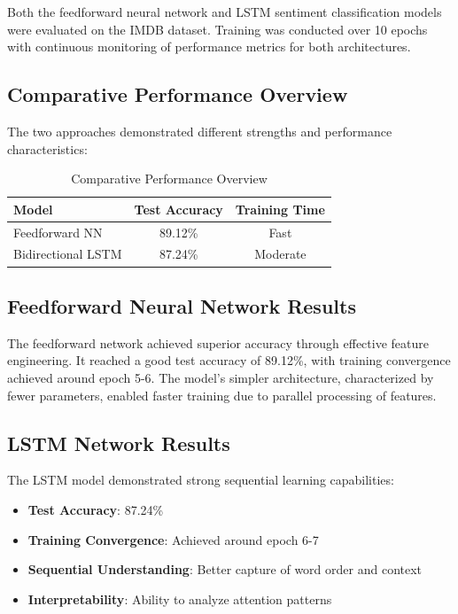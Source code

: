 \documentclass[a4paper, journal]{IEEEtran}
\begin{document}
Both the feedforward neural network and LSTM sentiment classification models were evaluated on the IMDB dataset. Training was conducted over 10 epochs with continuous monitoring of performance metrics for both architectures.

\subsection{Comparative Performance Overview}

The two approaches demonstrated different strengths and performance characteristics:

\begin{table}[ht]
\centering
\caption{Comparative Performance Overview}
\begin{tabular}{@{}lcc@{}}
\toprule
\textbf{Model} & \textbf{Test Accuracy} & \textbf{Training Time} \\
\midrule
Feedforward NN & 89.12\% & Fast \\
Bidirectional LSTM & 87.24\% & Moderate \\
\bottomrule
\end{tabular}
\label{tab:comparison}
\end{table}

\subsection{Feedforward Neural Network Results}

The feedforward network achieved superior accuracy through effective feature engineering. It reached a good test accuracy of 89.12\%, with training convergence achieved around epoch 5-6. The model's simpler architecture, characterized by fewer parameters, enabled faster training due to parallel processing of features.

\subsection{LSTM Network Results}

The LSTM model demonstrated strong sequential learning capabilities:

\begin{itemize}
    \item \textbf{Test Accuracy}: 87.24\%
    \item \textbf{Training Convergence}: Achieved around epoch 6-7
    \item \textbf{Sequential Understanding}: Better capture of word order and context
    \item \textbf{Interpretability}: Ability to analyze attention patterns
\end{itemize}
\end{document}
